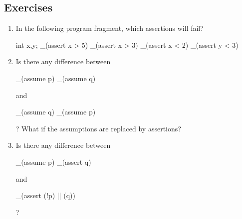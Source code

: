 \subsection*{Exercises}
\begin{enumerate}
\item
In the following program fragment, which assertions will fail?
\begin{VCC}
int x,y; 
_(assert x > 5) 
_(assert x > 3) 
_(assert x < 2) 
_(assert y < 3)
\end{VCC}
\item
Is there any difference between 
\begin{VCC}
_(assume p)
_(assume q)
\end{VCC}
and 
\begin{VCC}
_(assume q) 
_(assume p)
\end{VCC}
? What if the assumptions are replaced by assertions?
\item
Is there any difference between
\begin{VCC}
_(assume p)
_(assert q)
\end{VCC}
and 
\begin{VCC}
_(assert (!p) || (q))
\end{VCC}
? 

\end{enumerate}
